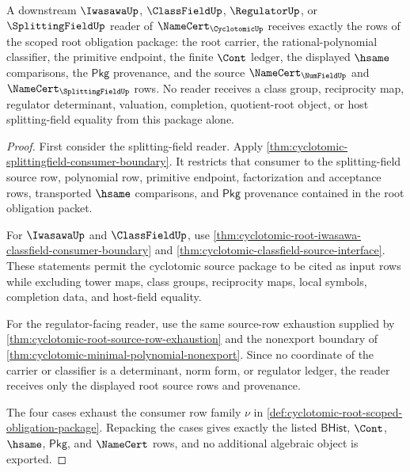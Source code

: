 \begin{theorem}
\label{thm:cyclotomic-root-consumer-scope-exhaustion}
A downstream $\IwasawaUp$, $\ClassFieldUp$, $\RegulatorUp$, or
$\SplittingFieldUp$ reader of $\NameCert_{\CyclotomicUp}$ receives exactly the
rows of the scoped root obligation package: the root carrier, the
rational-polynomial classifier, the primitive endpoint, the finite $\Cont$
ledger, the displayed $\hsame$ comparisons, the $\mathsf{Pkg}$ provenance, and
the source $\NameCert_{\NumFieldUp}$ and $\NameCert_{\SplittingFieldUp}$ rows.
No reader receives a class group, reciprocity map, regulator determinant,
valuation, completion, quotient-root object, or host splitting-field equality
from this package alone.
\end{theorem}
\begin{proof}
First consider the splitting-field reader. Apply
\autoref{thm:cyclotomic-splittingfield-consumer-boundary}. It restricts that
consumer to the splitting-field source row, polynomial row, primitive endpoint,
factorization and acceptance rows, transported $\hsame$ comparisons, and
$\mathsf{Pkg}$ provenance contained in the root obligation packet.

For $\IwasawaUp$ and $\ClassFieldUp$, use
\autoref{thm:cyclotomic-root-iwasawa-classfield-consumer-boundary} and
\autoref{thm:cyclotomic-classfield-source-interface}. These statements permit
the cyclotomic source package to be cited as input rows while excluding tower
maps, class groups, reciprocity maps, local symbols, completion data, and
host-field equality.

For the regulator-facing reader, use the same source-row exhaustion supplied by
\autoref{thm:cyclotomic-root-source-row-exhaustion} and the nonexport boundary
of \autoref{thm:cyclotomic-minimal-polynomial-nonexport}. Since no coordinate
of the carrier or classifier is a determinant, norm form, or regulator ledger,
the reader receives only the displayed root source rows and provenance.

The four cases exhaust the consumer row family $\nu$ in
\autoref{def:cyclotomic-root-scoped-obligation-package}. Repacking the cases
gives exactly the listed $\mathsf{BHist}$, $\Cont$, $\hsame$, $\mathsf{Pkg}$,
and $\NameCert$ rows, and no additional algebraic object is exported.
\end{proof}

